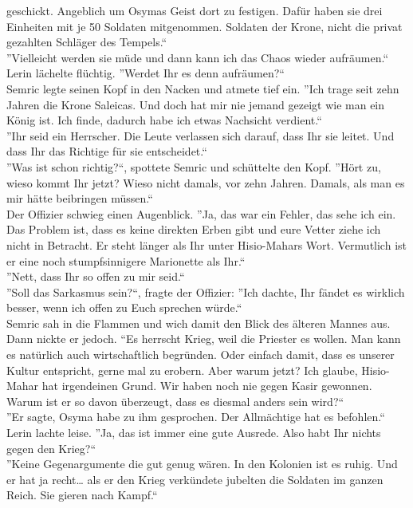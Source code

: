 geschickt. Angeblich um Osymas Geist dort zu festigen. Dafür haben sie drei Einheiten mit je 50 
Soldaten mitgenommen. Soldaten der Krone, nicht die privat gezahlten Schläger des Tempels.``\\
''Vielleicht werden sie  müde und dann kann ich das Chaos wieder aufräumen.``\\
Lerin lächelte flüchtig. ''Werdet Ihr es denn aufräumen?``\\
Semric legte seinen Kopf in den Nacken und atmete tief ein. ''Ich trage seit zehn Jahren die Krone 
Saleicas. Und doch hat mir nie jemand gezeigt wie man ein König ist. Ich finde, dadurch habe ich 
etwas Nachsicht verdient.``\\
''Ihr seid ein Herrscher. Die Leute verlassen sich darauf, dass Ihr sie leitet. Und dass Ihr 
das Richtige für sie entscheidet.``\\
''Was ist schon richtig?``, spottete Semric und schüttelte den Kopf. ''Hört zu, wieso kommt Ihr 
jetzt? 
Wieso nicht damals, vor zehn Jahren. Damals, als man es mir hätte beibringen müssen.``\\
Der Offizier schwieg einen Augenblick. ''Ja, das war ein Fehler, das sehe ich ein. Das Problem ist, 
dass es keine direkten Erben gibt und eure Vetter ziehe ich nicht in Betracht. Er steht länger als 
Ihr unter Hisio-Mahars Wort. Vermutlich ist er eine noch stumpfsinnigere Marionette als Ihr.``\\
''Nett, dass Ihr so offen zu mir seid.``\\
''Soll das Sarkasmus sein?``, fragte der Offizier: ''Ich dachte, Ihr fändet es wirklich besser, 
wenn 
ich offen zu Euch sprechen würde.``\\
Semric sah in die Flammen und wich damit den Blick des älteren Mannes aus. Dann nickte er jedoch. 
``Es herrscht Krieg, weil die Priester es wollen. Man kann es natürlich auch wirtschaftlich 
begründen. Oder einfach damit, dass es unserer Kultur entspricht, gerne mal zu erobern. Aber warum 
jetzt? Ich glaube, Hisio-Mahar hat irgendeinen Grund. Wir haben noch nie gegen Kasir gewonnen. 
Warum ist er so davon überzeugt, dass es diesmal anders sein wird?``\\
''Er sagte, Osyma habe zu ihm gesprochen. Der Allmächtige hat es befohlen.``\\
Lerin lachte leise. ''Ja, das ist immer eine gute Ausrede. Also habt Ihr nichts gegen den Krieg?``\\
''Keine Gegenargumente die gut genug wären. In den Kolonien ist es ruhig. Und er hat ja recht… als 
er 
den Krieg verkündete jubelten die Soldaten im ganzen Reich. Sie gieren nach Kampf.``\\
